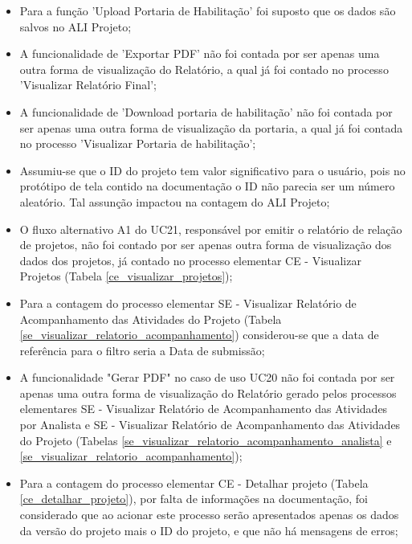   \begin{itemize}
   \item Para a função 'Upload Portaria de Habilitação' foi suposto que os dados são salvos no ALI Projeto;
   
   \item A funcionalidade de 'Exportar PDF' não foi contada por ser apenas uma outra forma de visualização do Relatório, a qual já foi contado
   no processo 'Visualizar Relatório Final';
   
   \item A funcionalidade de 'Download portaria de habilitação' não foi contada por ser apenas uma outra forma de visualização da portaria, a qual
   já foi contada no processo 'Visualizar Portaria de habilitação';
   
   \item Assumiu-se que o ID do projeto tem valor significativo para o usuário, pois no protótipo de tela contido na documentação o ID não 
    parecia ser um número aleatório. Tal assunção impactou na contagem do ALI Projeto;
   
   \item O fluxo alternativo A1 do UC21, responsável por emitir o relatório de relação de projetos, não foi contado por ser apenas outra forma
    de visualização dos dados dos projetos, já contado no processo elementar CE - Visualizar Projetos (Tabela \ref{ce_visualizar_projetos});
   
   \item Para a contagem do processo elementar SE - Visualizar Relatório de Acompanhamento das Atividades do Projeto
    (Tabela \ref{se_visualizar_relatorio_acompanhamento}) considerou-se que a data de referência para o filtro seria a Data de submissão;
    
   \item A funcionalidade "Gerar PDF" no caso de uso UC20 não foi contada por ser apenas uma outra forma de visualização do Relatório gerado
     pelos processos elementares SE - Visualizar Relatório de Acompanhamento das Atividades por Analista e 
     SE - Visualizar Relatório de Acompanhamento das Atividades do Projeto
     (Tabelas \ref{se_visualizar_relatorio_acompanhamento_analista} e \ref{se_visualizar_relatorio_acompanhamento});
     
   \item Para a contagem do processo elementar CE - Detalhar projeto (Tabela \ref{ce_detalhar_projeto}), por falta de informações na documentação,
     foi considerado que ao acionar este processo serão apresentados apenas os dados da versão do projeto mais o ID do projeto, e que não há 
     mensagens de erros;
     

\end{itemize}
